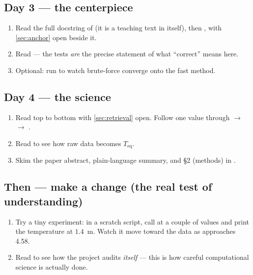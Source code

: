 \subsection*{Day 3 --- the centerpiece}
\begin{enumerate}[leftmargin=1.6em,itemsep=3pt,start=8]
  \item Read the full docstring of  (it is a teaching
    text in itself), then , with
    \autoref{sec:anchor} open beside it.
  \item Read  --- the tests \emph{are} the
    precise statement of what ``correct'' means here.
  \item Optional: run  to watch brute-force
    converge onto the fast method.
\end{enumerate}

\subsection*{Day 4 --- the science}
\begin{enumerate}[leftmargin=1.6em,itemsep=3pt,start=11]
  \item Read  top to bottom with
    \autoref{sec:retrieval} open. Follow one \Kd{} value through 
    $\to$  $\to$ .
  \item Read  to see how raw data becomes
    $T_{\mathrm{eq}}$.
  \item Skim the paper abstract, plain-language summary, and \S2 (methods) in
    .
\end{enumerate}

\subsection*{Then --- make a change (the real test of understanding)}
\begin{enumerate}[leftmargin=1.6em,itemsep=3pt,start=14]
  \item Try a tiny experiment: in a scratch script, call
     at a couple of \Kd{} values and print
    the temperature at $1.4$~m. Watch it move toward the data as \Kd{} approaches
    \num{4.58}.
  \item Read  to see how the project audits
    \emph{itself} --- this is how careful computational science is actually done.
\end{enumerate}

